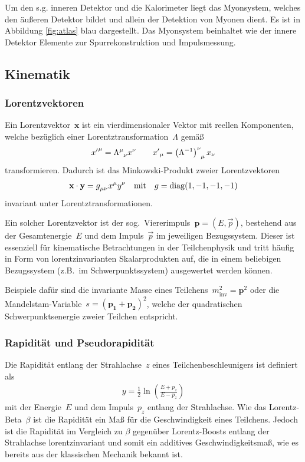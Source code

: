 \documentclass[11pt, a4paper]{article}
\numberwithin{equation}{section}
\begin{document}
Um den s.g. inneren Detektor und die Kalorimeter liegt das Myonsystem, welches den äußeren Detektor bildet und allein der Detektion von Myonen dient.
Es ist in Abbildung \ref{fig:atlas} blau dargestellt.
Das Myonsystem beinhaltet wie der innere Detektor Elemente zur Spurrekonstruktion und Impulsmessung.


\subsection{Kinematik}

\subsubsection{Lorentzvektoren}
Ein Lorentzvektor~$\mathbf{x}$ ist ein vierdimensionaler Vektor mit reellen Komponenten, welche bezüglich einer Lorentztransformation~$\Lambda$ gemäß
\begin{align*}
	{x^\prime}^\mu = \tensor{\Lambda}{^\mu_\nu} x^\nu \qquad {x^\prime}_\mu = \tensor{\left(\Lambda^{-1}\right)}{^\nu_\mu} x_\nu
\end{align*}
transformieren.
Dadurch ist das Minkowski-Produkt zweier Lorentzvektoren
\begin{align*}
	\mathbf{x} \cdot \mathbf{y} = \tensor{g}{_\mu_\nu} x^\mu y^\nu \quad \text{mit} \quad g = \mathrm{diag}(1,-1,-1,-1)
\end{align*}
invariant unter Lorentztransformationen.

Ein solcher Lorentzvektor ist der sog.\ Viererimpuls~$\mathbf{p} = \left(E, \vec{p}\right)$, bestehend aus der Gesamtenergie~$E$ und dem Impuls~$\vec{p}$ im jeweiligen Bezugssystem.
Dieser ist essenziell für kinematische Betrachtungen in der Teilchenphysik und tritt häufig in Form von lorentzinvarianten Skalarprodukten auf, die in einem beliebigen Bezugssystem (z.B.\ im Schwerpunktssystem) ausgewertet werden können.

Beispiele dafür sind die invariante Masse eines Teilchens~$m_\mathrm{inv}^2 = \mathbf{p}^2$ oder die Mandelstam-Variable~$s = (\mathbf{p_1} + \mathbf{p_2})^2$, welche der quadratischen Schwerpunktsenergie zweier Teilchen entspricht.

\subsubsection{Rapidität und Pseudorapidität}
Die Rapidität entlang der Strahlachse~$z$ eines Teilchenbeschleunigers ist definiert als
\begin{align*}
	y = \frac{1}{2}\ln\left( \frac{E+p_z}{E-p_z} \right)
\end{align*}
mit der Energie~$E$ und dem Impuls~$p_z$ entlang der Strahlachse.
Wie das Lorentz-Beta~$\beta$ ist die Rapidität ein Maß für die Geschwindigkeit eines Teilchens.
Jedoch ist die Rapidität im Vergleich zu $\beta$ gegenüber Lorentz-Boosts entlang der Strahlachse lorentzinvariant und somit ein additives Geschwindigkeitsmaß, wie es bereits aus der klassischen Mechanik bekannt ist.
\end{document}
